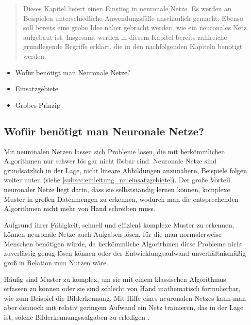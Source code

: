 \begin{tcolorbox}[title={Inhalt}]
  \begin{quotation}\noindent
      Dieses Kapitel liefert einen Einstieg in neuronale Netze. Es werden an Beispielen unterschiedliche Anwendungsfälle anschaulich gemacht.
      Ebenso soll bereits eine grobe Idee näher gebracht werden, wie ein neuronales Netz aufgebaut ist.
      Insgesamt werden in diesem Kapitel bereits zahlreiche grundlegende Begriffe erklärt, die in den nachfolgenden Kapiteln benötigt werden.
  \end{quotation}
  \begin{itemize}  
    \item Wofür benötigt man Neuronale Netze?
    \item Einsatzgebiete
    \item Grobes Prinzip
  \end{itemize}
\end{tcolorbox}

\subsection{Wofür benötigt man Neuronale Netze?}\label{subsec:einleitung_nn:wofuer_nn}
Mit neuronalen Netzen lassen sich Probleme lösen, die mit herkömmlichen Algorithmen nur schwer bis gar nicht lösbar sind. Neuronale Netze sind grundsätzlich in der Lage, nicht lineare Abbildungen anzunähern, Beispiele folgen weiter unten (siehe \ref*{subsec:einleitung_nn:einsatzgebiete}).
Der große Vorteil neuronaler Netze liegt darin, dass sie selbstständig lernen können, komplexe Muster in großen Datenmengen zu erkennen, wodurch man die entsprechenden Algorithmen nicht mehr von Hand schreiben muss. \cite{CA18}

\bigbreak\noindent
Aufgrund ihrer Fähigkeit, schnell und effizient komplexe Muster zu erkennen, können neuronale Netze auch Aufgaben lösen, für die man normalerweise Menschen benötigen würde, da herkömmliche Algorithmen diese Probleme nicht zuverlässig genug lösen können oder der Entwicklungsaufwand unverhältnismäßig groß in Relation zum Nutzen wäre. \cite{KSH17}

\bigbreak\noindent
Häufig sind Muster zu komplex, um sie mit einem klassischen Algorithmus erfassen zu können oder sie sind schlecht von Hand mathematisch formulierbar, wie zum Beispiel die Bilderkennung.
Mit Hilfe eines neuronalen Netzes kann man aber dennoch mit relativ geringem Aufwand ein Netz trainieren, das in der Lage ist, solche Bilderkennungsaufgaben zu erledigen \cite{KSH17}.

